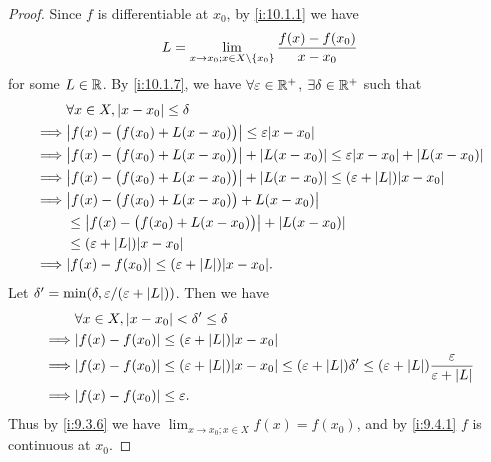 \begin{proof}
  Since \(f\) is differentiable at \(x_0\), by \cref{i:10.1.1} we have
  \[
    L = \lim_{x \to x_0 ; x \in X \setminus \left\lbrace x_0\right\rbrace} \dfrac{f(x) - f(x_0)}{x - x_0}
  \]
  for some \(L \in \mathbb{R}\).
  By \cref{i:10.1.7}, we have \(\forall \varepsilon \in \mathbb{R}^+\), \(\exists \delta \in \mathbb{R}^+\) such that
  \begin{align*}
             & \forall x \in X, \abs{x - x_0} \leq \delta                                                                      \\
    \implies & \abs{f(x) - \big(f(x_0) + L(x - x_0)\big)} \leq \varepsilon \abs{x - x_0}                                       \\
    \implies & \abs{f(x) - \big(f(x_0) + L(x - x_0)\big)} + \abs{L(x - x_0)} \leq \varepsilon \abs{x - x_0} + \abs{L(x - x_0)} \\
    \implies & \abs{f(x) - \big(f(x_0) + L(x - x_0)\big)} + \abs{L(x - x_0)} \leq (\varepsilon + \abs{L}) \abs{x - x_0}        \\
    \implies & \abs{f(x) - \big(f(x_0) + L(x - x_0)\big) + L(x - x_0)}                                                         \\
             & \leq \abs{f(x) - \big(f(x_0) + L(x - x_0)\big)} + \abs{L(x - x_0)}                                              \\
             & \leq (\varepsilon + \abs{L}) \abs{x - x_0}                                                                      \\
    \implies & \abs{f(x) - f(x_0)} \leq (\varepsilon + \abs{L}) \abs{x - x_0}.
  \end{align*}
  Let \(\delta' = \min(\delta, \varepsilon / (\varepsilon + \left\lvert L\right\rvert))\).
  Then we have
  \begin{align*}
             & \forall x \in X, \abs{x - x_0} < \delta' \leq \delta                                                                                                                        \\
    \implies & \abs{f(x) - f(x_0)} \leq (\varepsilon + \abs{L}) \abs{x - x_0}                                                                                                              \\
    \implies & \abs{f(x) - f(x_0)} \leq (\varepsilon + \abs{L}) \abs{x - x_0} \leq (\varepsilon + \abs{L}) \delta' \leq (\varepsilon + \abs{L}) \dfrac{\varepsilon}{\varepsilon + \abs{L}} \\
    \implies & \abs{f(x) - f(x_0)} \leq \varepsilon.
  \end{align*}
  Thus by \cref{i:9.3.6} we have \(\lim_{x \to x_0 ; x \in X} f(x) = f(x_0)\), and by \cref{i:9.4.1} \(f\) is continuous at \(x_0\).
\end{proof}

